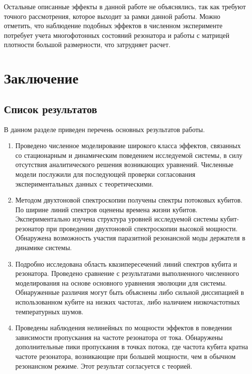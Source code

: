 \documentclass[12pt, twoside]{report}
\numberwithin{equation}{section}
\numberwithin{figure}{section}
\begin{document}
Остальные описанные эффекты в данной работе не объяснялись, так как требуют точного рассмотрения, которое выходит за рамки данной работы. Можно отметить, что наблюдение подобных эффектов в численном эксперименте потребует учета многофотонных состояний резонатора и работы с матрицей плотности большой размерности, что затрудняет расчет.

\chapter{Заключение}

\section{Список результатов}
В данном разделе приведен перечень основных результатов работы.
\begin{enumerate}

\item Проведено численное моделирование широкого класса эффектов, связанных со стационарным и динамическим поведением исследуемой системы, в силу отсутствия аналитического решения возникающих уравнений. Численные модели послужили для последующей проверки согласования экспериментальных данных с теоретическими.

\item Методом двухтоновой спектроскопии получены спектры потоковых кубитов. По ширине линий спектров оценены времена жизни кубитов. Экспериментально изучена структура уровней исследуемой системы кубит-резонатор при проведении двухтоновой спектроскопии высокой мощности. Обнаружена возможность участия паразитной резонансной моды держателя в динамике системы.

\item Подробно исследована область квазипересечений линий спектров кубита и резонатора. Проведено сравнение с результатами выполненного численного моделирования на основе основного уравнения эволюции для системы.  Обнаруженные различия могут быть объяснены либо сильной диссипацией в использованном кубите на низких частотах, либо наличием низкочастотных температурных шумов.

\item Проведены наблюдения нелинейных по мощности эффектов в поведении зависимости пропускания на частоте резонатора  от тока. Обнаружены дополнительные пики пропускания в точках потока, где частота кубита кратна частоте резонатора, возникающие при большей мощности, чем в обычном резонансном режиме. Этот результат согласуется с теорией.

\end{enumerate}
\end{document}
